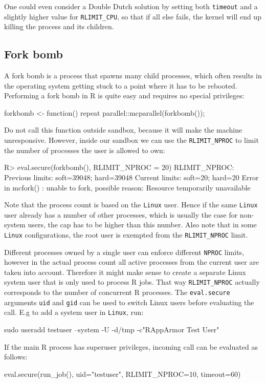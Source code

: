 \documentclass[article]{jss}
\newcommand{\R}{\textsf{R}\xspace}
\newcommand{\Linux}{\texttt{Linux}\xspace}
\begin{document}
\begin{appendices}
One could even consider a Double Dutch solution by setting both \texttt{timeout}
and a slightly higher value for \texttt{RLIMIT\_CPU}, so that if all else fails,
the kernel will end up killing the process and its children.

\subsection{Fork bomb}

A fork bomb is a process that spawns many child processes, which often results
in the operating system getting stuck to a point where it has to be rebooted.
Performing a fork bomb in \R is quite easy and requires no special privileges:
\begin{CodeChunk}
\begin{CodeInput}
forkbomb <- function(){
  repeat{
    parallel::mcparallel(forkbomb());
  }
}
\end{CodeInput}
\end{CodeChunk}
Do not call this function outside sandbox, because it will make the machine
unresponsive. However, inside our sandbox we can use the \texttt{RLIMIT\_NPROC}
to limit the number of processes the user is allowed to own:
\begin{CodeChunk}
\begin{CodeInput}
R> eval.secure(forkbomb(), RLIMIT_NPROC = 20)
RLIMIT_NPROC:
Previous limits: soft=39048; hard=39048
Current limits: soft=20; hard=20
Error in mcfork() :
  unable to fork, possible reason: Resource temporarily unavailable
\end{CodeInput}
\end{CodeChunk}
Note that the process count is based on the \Linux user. Hence if the same
\Linux user already has a number of other processes, which is usually the case for
non-system users, the cap has to be higher than this number. Also note
that in some \Linux configurations, the root user is exempted from the
\texttt{RLIMIT_NPROC} limit.

Different processes owned by a single user can enforce different \texttt{NPROC}
limits, however in the actual process count all active processes from the
current user are taken into account. Therefore it might make sense to create a
separate Linux system user that is only used to process \R jobs. That way
\texttt{RLIMIT\_NPROC} actually corresponds to the number of concurrent \R
processes. The \texttt{eval.secure} arguments \texttt{uid} and \texttt{gid}
can be used to switch Linux users before evaluating the call. E.g to add a
system user in \Linux, run:
\begin{CodeChunk}
\begin{CodeInput}
sudo useradd testuser --system -U -d/tmp -c"RAppArmor Test User"
\end{CodeInput}
\end{CodeChunk}
If the main \R process has superuser privileges, incoming call can be
evaluated as follows:
\begin{CodeChunk}
\begin{CodeInput}
eval.secure(run_job(), uid="testuser", RLIMIT_NPROC=10, timeout=60)
\end{CodeInput}
\end{CodeChunk}



\end{appendices}
\end{document}
